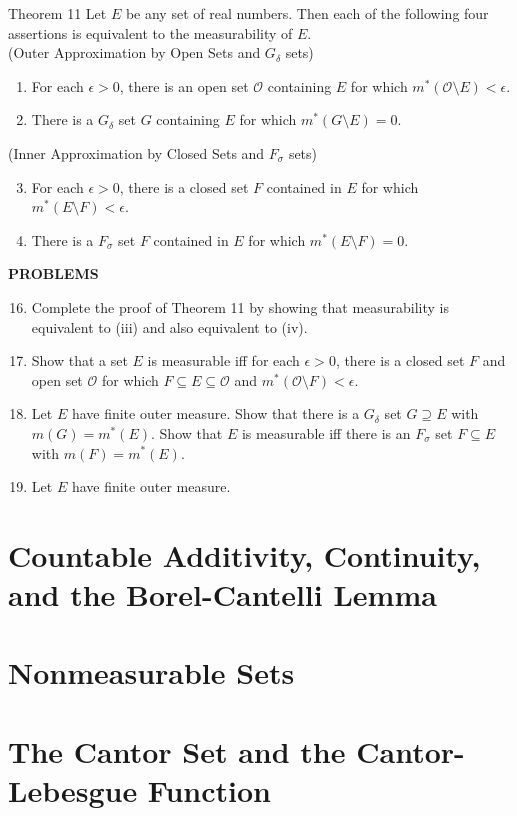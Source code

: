 \begin{namedthm*}{Theorem 11}
	Let $E$ be any set of real numbers. Then each of the following four assertions is equivalent to the measurability of $E$.\\
	(Outer Approximation by Open Sets and $G_\delta$ sets)
	\begin{enumerate}[label=(\roman*),align=left]
        \item For each $\epsilon>0$, there is an open set $\mathcal{O}$ containing $E$ for which $m^*(\mathcal{O}\setminus E)<\epsilon$.
        \item There is a $G_\delta$ set $G$ containing $E$ for which $m^*(G\setminus E)=0$. 
    \end{enumerate}
	(Inner Approximation by Closed Sets and $F_\sigma$ sets)
	\begin{enumerate}[label=(\roman*),align=left]
        \setcounter{enumi}{2}
		\item For each $\epsilon>0$, there is a closed set $F$ contained in $E$ for which $m^*(E\setminus F)<\epsilon$.
        \item There is a $F_\sigma$ set $F$ contained in $E$ for which $m^*(E\setminus F)=0$.
    \end{enumerate}
\end{namedthm*}

\begin{center}
	\textbf{PROBLEMS}
\end{center}
\begin{enumerate}
	\setcounter{enumi}{15}
	\item Complete the proof of Theorem 11 by showing that measurability is equivalent to (iii) and also equivalent to (iv).
	\item Show that a set $E$ is measurable iff for each $\epsilon>0$, there is a closed set $F$ and open set $\mathcal{O}$ for which $F\subseteq E\subseteq \mathcal{O}$ and $m^*(\mathcal{O}\setminus F)<\epsilon$.
	\item Let $E$ have finite outer measure. Show that there is a $G_\delta$ set $G\supseteq E$ with $m(G)=m^*(E)$.
	Show that $E$ is measurable iff there is an $F_\sigma$ set $F \subseteq E$ with $m(F)=m^*(E)$. 
	\item Let $E$ have finite outer measure.
\end{enumerate}

\section{Countable Additivity, Continuity, and the Borel-Cantelli Lemma}

\section{Nonmeasurable Sets}

\section{The Cantor Set and the Cantor-Lebesgue Function}
